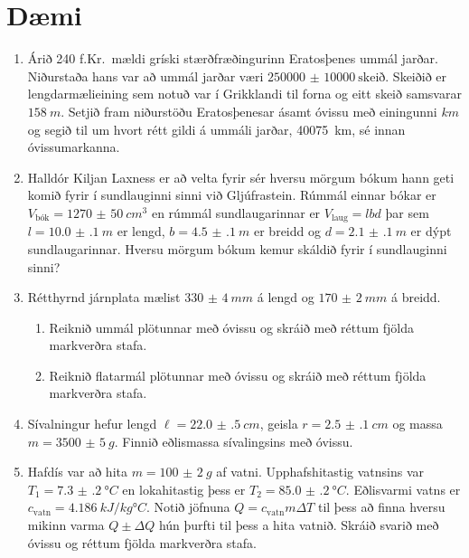\section{Dæmi}


\begin{enumerate}[label = \textbf{Dæmi \thechapter.\arabic*.}]

\item Árið 240 f.Kr.~mældi gríski stærðfræðingurinn Eratosþenes ummál jarðar. Niðurstaða hans var að ummál jarðar væri $\SI{250000(10000)}{\text{skeið}}$. Skeiðið er lengdarmælieining sem notuð var í Grikklandi til forna og eitt skeið samsvarar $\SI{158}{m}$. Setjið fram niðurstöðu Eratosþenesar ásamt óvissu með einingunni $\si{km}$ og segið til um hvort rétt gildi á ummáli jarðar, \SI{40075}{km}, sé innan óvissumarkanna.

\item Halldór Kiljan Laxness er að velta fyrir sér hversu mörgum bókum hann geti komið fyrir í sundlauginni sinni við Gljúfrastein. Rúmmál einnar bókar er $V_{\text{bók}} = \SI{1270(50)}{cm^3}$ en rúmmál sundlaugarinnar er $V_{\text{laug}} = lbd$ þar sem $l = \SI{10.0(1)}{m}$ er lengd, $b = \SI{4.5(1)}{m}$ er breidd og $d = \SI{2.1(1)}{m}$ er dýpt sundlaugarinnar. Hversu mörgum bókum kemur skáldið fyrir í sundlauginni sinni?

\item Rétthyrnd járnplata mælist $\SI{330(4)}{mm}$ á lengd og $\SI{170(2)}{mm}$ á breidd.
\begin{enumerate}[label = \textbf{(\alph*)}]
    \item Reiknið ummál plötunnar með óvissu og skráið með réttum fjölda markverðra stafa.
    \item Reiknið flatarmál plötunnar með óvissu og skráið með réttum fjölda markverðra stafa.
\end{enumerate}

\item Sívalningur hefur lengd $\ell = \SI{22.0(5)}{cm}$, geisla $r = \SI{2.5(1)}{cm}$ og massa $m = \SI{3500(5)}{g}$. Finnið eðlismassa sívalingsins með óvissu.

\item Hafdís var að hita $m = \SI{100(2)}{g}$ af vatni. Upphafshitastig vatnsins var $T_1 = \SI{7.3(2)}{\degree C}$ en lokahitastig þess er $T_2 = \SI{85.0(2)}{\degree C}$. Eðlisvarmi vatns er $c_{\text{vatn}} = \SI{4.186}{kJ/kg\degree C}$. Notið jöfnuna $Q = c_{\text{vatn}}m\Delta T$ til þess að finna hversu mikinn varma $Q \pm \Delta Q$ hún þurfti til þess a hita vatnið. Skráið svarið með óvissu og réttum fjölda markverðra stafa.


\end{enumerate}
